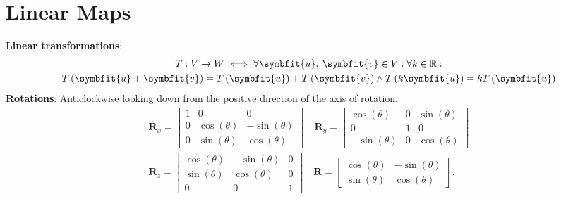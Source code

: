 \documentclass{article}
\begin{document}
\begin{minipage}[t]{126.1962963mm}
    \section*{Linear Maps}
    \textbf{Linear transformations}:
    \begin{gather*}
        T:V\rightarrow W \iff \forall \symbfit{u},\: \symbfit{v} \in V:\forall k \in \mathbb{R}: \\
        T\left(\symbfit{u}+\symbfit{v}\right) = T\left(\symbfit{u}\right) + T\left(\symbfit{v}\right) \wedge T\left(k\symbfit{u}\right) = kT\left(\symbfit{u}\right)
    \end{gather*}
    \textbf{Rotations}: Anticlockwise looking down from the positive direction of the
    axis of rotation.
    \begin{align*}
        \symbf{R}_x =
        \begin{bmatrix}
            1 & 0                           & 0                            \\
            0 & \cos{\left( \theta \right)} & -\sin{\left( \theta \right)} \\
            0 & \sin{\left( \theta \right)} & \cos{\left( \theta \right)}
        \end{bmatrix}
        \quad \symbf{R}_y =
        \begin{bmatrix}
            \cos{\left( \theta \right)}  & 0 & \sin{\left( \theta \right)} \\
            0                            & 1 & 0                           \\
            -\sin{\left( \theta \right)} & 0 & \cos{\left( \theta \right)}
        \end{bmatrix} \\
        \symbf{R}_z =
        \begin{bmatrix}
            \cos{\left( \theta \right)} & -\sin{\left( \theta \right)} & 0 \\
            \sin{\left( \theta \right)} & \cos{\left( \theta \right)}  & 0 \\
            0                           & 0                            & 1
        \end{bmatrix}
        \quad \symbf{R} =
        \begin{bmatrix}
            \cos{\left( \theta \right)} & -\sin{\left( \theta \right)} \\
            \sin{\left( \theta \right)} & \cos{\left( \theta \right)}
        \end{bmatrix}.

\end{align*}
\end{minipage}
\end{document}
